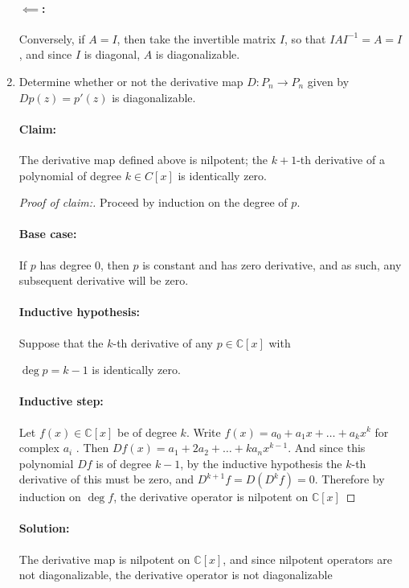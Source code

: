 \documentclass{article}
\begin{document}
\begin{enumerate}
    \paragraph{$\impliedby$:} Conversely, if $A=I$, then take the invertible matrix $I$, so that $IAI^{-1}=A=I$, and since $I$ is diagonal, $A$ is diagonalizable. 

\item Determine whether or not the derivative map $D : P_n \rightarrow P_n$ given by $Dp(z) = p'(z)$ is diagonalizable.
    \paragraph{Claim: }The derivative map defined above is nilpotent; the $k+1$-th derivative of a polynomial of degree $k\in C[x]$ is identically zero. 
    \begin{proof} [Proof of claim:]
        
  Proceed by induction on the degree of $p$. 
  \paragraph{Base case:} If $p$ has degree $0$, then $p$ is constant and has zero derivative, and as such, any subsequent derivative will be zero.
  \paragraph{Inductive hypothesis:} Suppose that the $k$-th derivative of any  $p \in \mathbb{C}[x]$ with 

  $\deg p=k-1$ is identically zero.
  \paragraph{Inductive step:} Let $f(x)\in \mathbb{C}[x]$ be of degree $k$. Write $f(x)=a_0+a_1x+\ldots+a_kx^{k}$ for complex $a_i$ . Then $Df(x)=a_1+2a_2+\ldots+ka_nx^{k-1}$. And since this polynomial $Df$ is of degree $k-1$, by the inductive hypothesis the $k$-th derivative of this must be zero, and \newline $D^{k+1}f=D(D^{k}f)=0$. Therefore by induction on $\deg f$, the derivative operator is nilpotent on $\mathbb{C}[x]$
    \end{proof}
  \paragraph{Solution: } The derivative map is nilpotent on $\mathbb{C}[x]$, and since nilpotent operators are not diagonalizable, the derivative operator is not diagonalizable

\end{enumerate}
\end{document}
